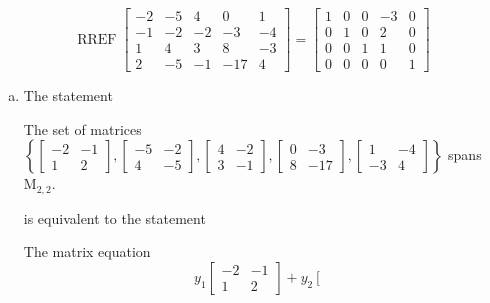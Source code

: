 \begin{exerciseAnswer} 


\[\operatorname{RREF} \left[\begin{array}{ccccc}
-2 & -5 & 4 & 0 & 1 \\
-1 & -2 & -2 & -3 & -4 \\
1 & 4 & 3 & 8 & -3 \\
2 & -5 & -1 & -17 & 4
\end{array}\right] = \left[\begin{array}{ccccc}
1 & 0 & 0 & -3 & 0 \\
0 & 1 & 0 & 2 & 0 \\
0 & 0 & 1 & 1 & 0 \\
0 & 0 & 0 & 0 & 1
\end{array}\right] \]


\begin{enumerate}[(a)]
\item The statement 
\begin{center}\begin{minipage}{0.8\textwidth}
 The set of matrices \( \left\{ \left[\begin{array}{cc}
-2 & -1 \\
1 & 2
\end{array}\right] , \left[\begin{array}{cc}
-5 & -2 \\
4 & -5
\end{array}\right] , \left[\begin{array}{cc}
4 & -2 \\
3 & -1
\end{array}\right] , \left[\begin{array}{cc}
0 & -3 \\
8 & -17
\end{array}\right] , \left[\begin{array}{cc}
1 & -4 \\
-3 & 4
\end{array}\right] \right\} \) spans \(\mathrm{M}_{2,2}\). 
\end{minipage}\end{center}
     is equivalent to the statement 
\begin{center}\begin{minipage}{0.8\textwidth}
 The matrix equation \[ y_{1} \left[\begin{array}{cc}
-2 & -1 \\
1 & 2
\end{array}\right] + y_{2} \left[\begin{array}{cc}

\end{array}\]
\end{minipage}
\end{center}
\end{enumerate}
\end{exerciseAnswer}
